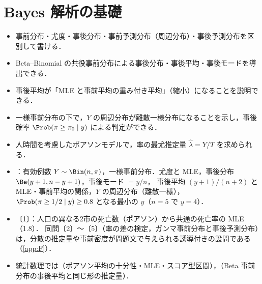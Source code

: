 \chapter{Bayes 解析の基礎}\label{ch:17}

\begin{goalbox}
\begin{itemize}
\item 事前分布・尤度・事後分布・事前予測分布（周辺分布）・事後予測分布を区別して書ける．
\item Beta--Binomial の共役事前分布による事後分布・事後平均・事後モードを導出できる．
\item 事後平均が「MLE と事前平均の重み付き平均」（縮小）になることを説明できる．
\item 一様事前分布の下で，$Y$ の周辺分布が離散一様分布になることを示し，事後確率 $\Prob(\pi\ge\pi_0\mid y)$ による判定ができる．
\item 人時間を考慮したポアソンモデルで，率の最尤推定量 $\hat\lambda=Y/T$ を求められる．
\end{itemize}
\end{goalbox}

\begin{exambox}
\begin{itemize}
\item {}：有効例数 $Y\sim\Bin(n,\pi)$，一様事前分布．尤度と MLE，事後分布 $\Be(y+1,n-y+1)$，事後モード $=y/n$，
      事後平均 $(y+1)/(n+2)$ と MLE・事前平均の関係，$Y$ の周辺分布（離散一様），$\Prob(\pi\ge1/2\mid y)\ge0.8$ となる最小の $y$（$n=5$ で $y=4$）．
\item {}〔1〕：人口の異なる2市の死亡数（ポアソン）から共通の死亡率の MLE（1.8）．
      同問〔2〕〜〔5〕（率の差の検定，ガンマ事前分布と事後予測分布）は，分散の推定量や事前密度が問題文で与えられる誘導付きの設問である（\cref{app:F}）．
\item 統計数理では（ポアソン平均の十分性・MLE・スコア型区間），（Beta 事前分布の事後平均と同じ形の推定量）．
\end{itemize}
\end{exambox}


